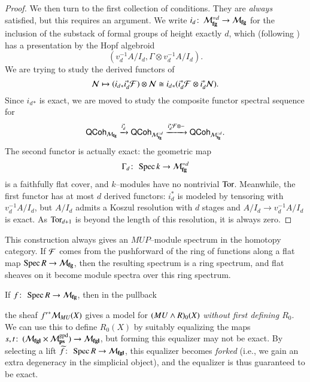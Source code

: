 \begin{proof}
We then turn to the first collection of conditions.  They are \emph{always} satisfied, but this requires an argument.  We write $i_d\colon\thinspace \mathcal{M}_{\mathbf{fg}}^{= d} \to \mathcal{M}_{\mathbf{fg}}$ for the inclusion of the substack of formal groups of height exactly $d$, which (following ) has a presentation by the Hopf algebroid \[(v_d^{-1} A / I_d, \Gamma \otimes v_d^{-1} A / I_d).\]  We are trying to study the derived functors of \[\mathcal{N} \mapsto (i_d{}_* i_d^* \mathcal{F}) \otimes \mathcal{N} \cong i_d{}_* (i_d^* \mathcal{F} \otimes i_d^* \mathcal{N}).\]  Since $i_d{}_*$ is exact, we are moved to study the composite functor spectral sequence for \[\mathsf{QCoh}_{\mathcal{M}_{\mathbf{fg}}} \xrightarrow{i_d^*} \mathsf{QCoh}_{\mathcal{M}_{\mathbf{fg}}^{=d}} \xrightarrow{i_d^* \mathcal{F} \otimes -} \mathsf{QCoh}_{\mathcal{M}_{\mathbf{fg}}^{=d}}.\]  The second functor is actually exact: the geometric map \[\Gamma_d\colon\thinspace \operatorname{Spec} k \to \mathcal{M}_{\mathbf{fg}}^{=d}\] is a faithfully flat cover, and $k$--modules have no nontrivial $\operatorname{Tor}$.  Meanwhile, the first functor has at most $d$ derived functors: $i_d^*$ is modeled by tensoring with $v_d^{-1} A / I_d$, but $A / I_d$ admits a Koszul resolution with $d$ stages and $A / I_d \to v_d^{-1} A / I_d$ is exact.  As $\operatorname{Tor}_{d+1}$ is beyond the length of this resolution, it is always zero.
\end{proof}

\begin{remark}
This construction always gives an $MUP$--module spectrum in the homotopy category.  If $\mathcal{F}$ comes from the pushforward of the ring of functions along a flat map $\operatorname{Spec} R \to \mathcal{M}_{\mathbf{fg}}$, then the resulting spectrum is a ring spectrum, and flat sheaves on it become module spectra over this ring spectrum.
\end{remark}

\begin{remark}\label{PullingBackOverMfgVsMfgl}
If $f\colon\thinspace \operatorname{Spec} R \to \mathcal{M}_{\mathbf{fg}}$, then in the pullback
\begin{center}
\end{center}
the sheaf ${f'}^* \mathcal{M}_{MU}(X)$ gives a model for $(MU \wedge R)_0(X)$ \emph{without first defining $R_0$}.  We can use this to define $R_0(X)$ by suitably equalizing the maps $s, t\colon\thinspace (\mathcal{M}_{\mathbf{fgl}} \times \mathcal{M}_{\mathbf{ps}}^{\mathrm{gpd}}) \to \mathcal{M}_{\mathbf{fgl}}$, but forming this equalizer may not be exact.  By selecting a lift $\widetilde f\colon\thinspace \operatorname{Spec} R \to \mathcal{M}_{\mathbf{fgl}}$, this equalizer becomes \emph{forked} (i.e., we gain an extra degeneracy in the simplicial object), and the equalizer is thus guaranteed to be exact.  
\end{remark}

